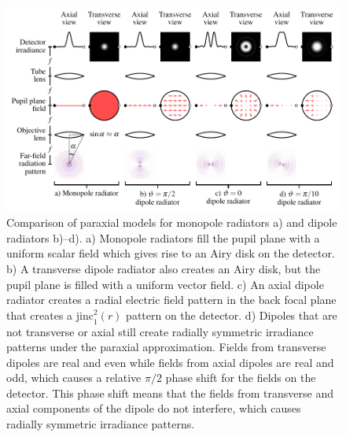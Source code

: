 \documentclass[]{osa-article}
\begin{document}
\begin{figure}[h]
 \centering
   \centering
   \includegraphics[scale=0.8]{../figures/microscope/microscope.pdf}
   \caption{Comparison of paraxial models for monopole radiators a) and dipole
     radiators b)--d). a) Monopole radiators fill the pupil plane with a uniform
     scalar field which gives rise to an Airy disk on the detector. b) A
     transverse dipole radiator also creates an Airy disk, but the pupil plane
     is filled with a uniform vector field. c) An axial dipole radiator creates
     a radial electric field pattern in the back focal plane that creates a
     $\text{jinc}_1^2(r)$ pattern on the detector. d) Dipoles that are not
     transverse or axial still create radially symmetric irradiance patterns
     under the paraxial approximation. Fields from transverse dipoles are real
     and even while fields from axial dipoles are real and odd, which causes a
     relative $\pi/2$ phase shift for the fields on the detector. This phase
     shift means that the fields from transverse and axial components of the
     dipole do not interfere, which causes radially symmetric irradiance
     patterns.}
   \label{fig:microscopefig}
 \end{figure}
\end{document}
